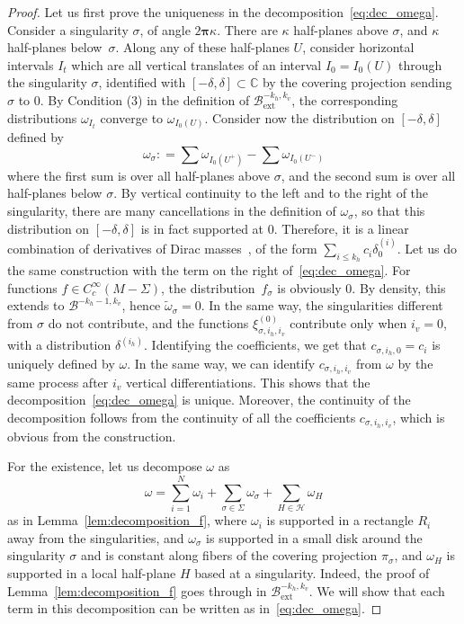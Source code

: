 \documentclass[JEP,XML,SOM,Unicode]{cedram}
\newcommand{\ext}{\mathrm{ext}}
\newcommand{\boH}{\mathcal{H}}
\newcommand{\boB}{\mathcal{B}}
\newcommand{\CC}{\mathbb{C}}
\newcommand{\bpi}{\boldsymbol{\pi}}
\newcommand{\coloneqq}{\mathrel{\mathop:}=}
\theoremstyle{definition}
\numberwithin{equation}{section}
\begin{document}
\begin{proof}
Let us first prove the uniqueness in the decomposition~\eqref{eq:dec_omega}.
Consider a singularity $\sigma$, of angle $2\bpi\kappa$. There are $\kappa$
half-planes above $\sigma$, and $\kappa$ half-planes below~$\sigma$. Along
any of these half-planes $U$, consider horizontal intervals $I_t$ which are
all vertical translates of an interval $I_0=I_0(U)$ through the singularity
$\sigma$, identified with \hbox{$[-\delta,\delta] \subset \CC$} by the covering
projection sending $\sigma$ to $0$. By Condition (3) in the definition of
$\boB_{\ext}^{-k_h, k_v}$, the corresponding distributions $\omega_{I_t}$
converge to $\omega_{I_0(U)}$. Consider now the distribution on
$[-\delta,\delta]$ defined by
\begin{equation*}
\omega_\sigma \coloneqq \sum \omega_{I_0(U^+)} - \sum \omega_{I_0(U^-)}
\end{equation*}
where the first sum is over all half-planes above $\sigma$, and the second
sum is over all half-planes below $\sigma$. By vertical continuity to the
left and to the right of the singularity, there are many cancellations in the
definition of $\omega_\sigma$, so that this distribution on $[-\delta,
\delta]$ is in fact supported at $0$. Therefore, it is a linear combination
of derivatives of Dirac masses~\cite[Th.\,2.3.4]{hormander}, of the form
$\sum_{i\leq k_h} c_i \delta^{(i)}_0$. Let us do the same construction with
the term on the right of~\eqref{eq:dec_omega}. For functions $f \in
C^\infty_c(M-\Sigma)$, the distribution~$f_\sigma$ is obviously $0$. By
density, this extends to $\boB^{-k_h-1, k_v}$, hence $\tilde \omega_\sigma =
0$. In the same way, the singularities different from $\sigma$ do not
contribute, and the functions $\xi^{(0)}_{\sigma, i_h, i_v}$ contribute only
when $i_v = 0$, with a distribution $\delta^{(i_h)}$. Identifying the
coefficients, we get that $c_{\sigma, i_h, 0} = c_i$ is uniquely defined by
$\omega$. In the same way, we can identify $c_{\sigma, i_h, i_v}$ from
$\omega$ by the same process after $i_v$ vertical differentiations. This
shows that the decomposition~\eqref{eq:dec_omega} is unique. Moreover, the
continuity of the decomposition follows from the continuity of all the
coefficients $c_{\sigma, i_h, i_v}$, which is obvious from the construction.

For the existence, let us decompose $\omega$ as
\begin{equation*}
\omega = \sum_{i=1}^N \omega_i + \sum_{\sigma\in \Sigma} \omega_\sigma + \sum_{H \in \boH} \omega_H
\end{equation*}
as in Lemma~\ref{lem:decomposition_f}, where $\omega_i$ is supported in a
rectangle $R_i$ away from the singularities, and $\omega_\sigma$ is supported
in a small disk around the singularity $\sigma$ and is constant along fibers
of the covering projection $\pi_\sigma$, and $\omega_H$ is supported in a
local half-plane $H$ based at a singularity. Indeed, the proof of
Lemma~\ref{lem:decomposition_f} goes through in $\boB^{-k_h, k_v}_{\ext}$. We
will show that each term in this decomposition can be written as
in~\eqref{eq:dec_omega}.


\end{proof}
\end{document}
